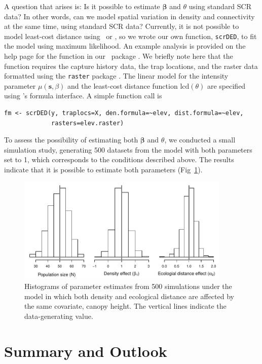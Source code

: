 A question that arises is: Is it possible to estimate $\bm \beta$
and $\theta$ using standard SCR data? In other words, can we model
spatial variation in density and connectivity at the same time,
using standard SCR data? Currently, it is not possible to
model least-cost distance using \jags~or \secr, so we wrote our own
function, \verb+scrDED+, to fit the model using maximum likelihood. An
example analysis is provided on the help page for the function in our
\R~package \scrbook. We briefly note here that the function requires
the capture history data, the trap locations, and the raster data
formatted using the {\tt raster} package
\citep{hijmans_vanetten:2012}. The linear model for the
intensity parameter $\mu(\mathbf{s}, \beta)$ and the least-cost distance
function $\text{lcd}(\theta)$ are specified using \R's formula interface. A
simple function call is
\begin{verbatim}
fm <- scrDED(y, traplocs=X, den.formula=~elev, dist.formula=~elev,
             rasters=elev.raster)
\end{verbatim}
To assess the possibility of estimating both $\bm \beta$ and $\theta$, we
conducted a small simulation study, generating 500 datasets from the
model with both parameters set to 1, which corresponds to the
conditions described above. The results indicate that it is
possible to estimate both parameters
(Fig~\ref{chapt.ecoldist.fig.simDED}).

\begin{figure}[ht]
\centering
\includegraphics[width=4in,height=2in]{Ch12-EcolDist/figs/scrDEDsim}
\caption{Histograms of parameter estimates from 500 simulations under
  the model in which both density and ecological distance are affected
by the same covariate, canopy height. The vertical lines indicate the
data-generating value.}
\label{chapt.ecoldist.fig.simDED}
\end{figure}



\section{Summary and Outlook}


